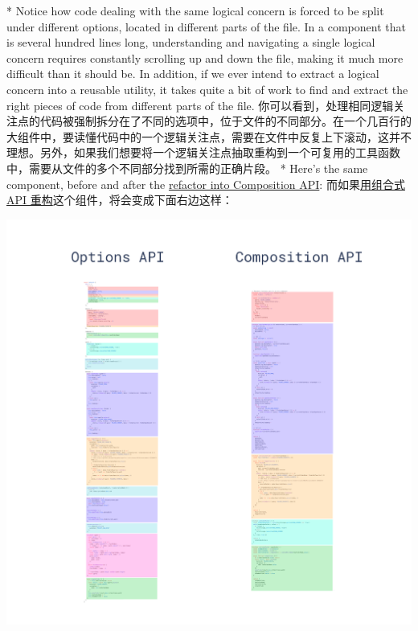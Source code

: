 \begin{center}
\end{center}
    

\begin{paracol}{2} 
 
\switchcolumn[0]*%
Notice how code dealing with the same logical concern is forced to be
split under different options, located in different parts of the file.
In a component that is several hundred lines long, understanding and
navigating a single logical concern requires constantly scrolling up and
down the file, making it much more difficult than it should be. In
addition, if we ever intend to extract a logical concern into a reusable
utility, it takes quite a bit of work to find and extract the right
pieces of code from different parts of the file.
\switchcolumn
你可以看到，处理相同逻辑关注点的代码被强制拆分在了不同的选项中，位于文件的不同部分。在一个几百行的大组件中，要读懂代码中的一个逻辑关注点，需要在文件中反复上下滚动，这并不理想。另外，如果我们想要将一个逻辑关注点抽取重构到一个可复用的工具函数中，需要从文件的多个不同部分找到所需的正确片段。
\switchcolumn[0]*%
Here's the same component, before and after the
\href{https://gist.github.com/yyx990803/8854f8f6a97631576c14b63c8acd8f2e}{refactor
into Composition API}:
\switchcolumn
而如果\href{https://gist.github.com/yyx990803/8854f8f6a97631576c14b63c8acd8f2e}{用组合式
API 重构}这个组件，将会变成下面右边这样：
\end{paracol}

\begin{center} 
\includegraphics{./img/62783026-810e6180-ba89-11e9-8774-e7771c8095d6.png} 
\end{center}
     

